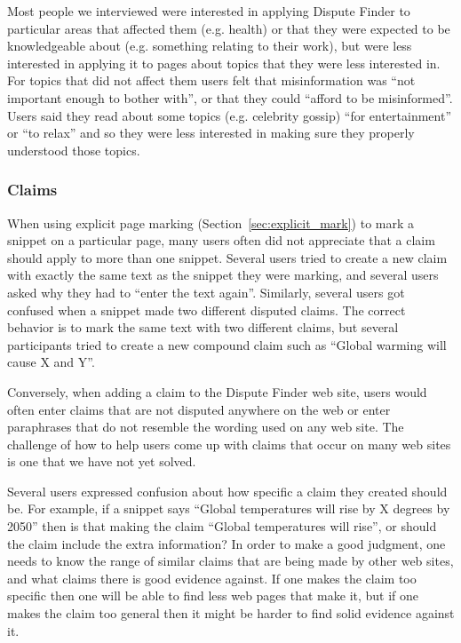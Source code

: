 \documentclass{www2010-accepted}
\begin{document}
Most people we interviewed were interested in applying Dispute Finder to particular areas that affected them (e.g. health) or that they were expected to be knowledgeable about (e.g. something relating to their work), but were less interested in applying it to pages about topics that they were less interested in. For topics that did not affect them users felt that misinformation was ``not important enough to bother with'', or that they could ``afford to be misinformed''. Users said they read about some topics (e.g. celebrity gossip) ``for entertainment'' or ``to relax'' and so they were less interested in making sure they properly understood those topics.

%

\subsubsection{Claims}

When using explicit page marking (Section~\ref{sec:explicit_mark}) to mark a snippet on a particular page, many users often did not appreciate that a claim should apply to more than one snippet. Several users tried to create a new claim with exactly the same text as the snippet they were marking, and several users asked why they had to ``enter the text again''. Similarly, several users got confused when a snippet made two different disputed claims. The correct behavior is to mark the same text with two different claims, but several participants tried to create a new compound claim such as ``Global warming will cause X and Y''. 

Conversely, when adding a claim to the Dispute Finder web site, users would often enter claims that are not disputed anywhere on the web or enter paraphrases that do not resemble the wording used on any web site. The challenge of how to help users come up with claims that occur on many web sites is one that we have not yet solved.

Several users expressed confusion about how specific a claim they created should be. For example, if a snippet says ``Global temperatures will rise by X degrees by 2050'' then is that making the claim ``Global temperatures will rise'', or should the claim include the extra information? In order to make a good judgment, one needs to know the range of similar claims that are being made by other web sites, and what claims there is good evidence against. If one makes the claim too specific then one will be able to find less web pages that make it, but if one makes the claim too general then it might be harder to find solid evidence against it.
\end{document}
